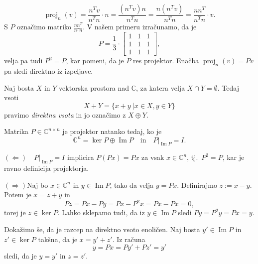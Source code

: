 \documentclass[mat1]{fmfdelo}
\newcommand{\C}{\mathbb C}
\DeclareMathOperator{\Ima}{Im}
\begin{document}
\begin{zgled}
\begin{equation*}
        \operatorname{proj}_{n}(v) = \frac{n^T  v}{n^T n}\cdot n = \frac{\left(n^T  v\right)n}{n^T n} = \frac{n\left(n^T  v\right)}{n^T n} = \frac{n  n^T}{n^T n}\cdot v.
    \end{equation*}
    S $P$ označimo matriko $\frac{n  n^T}{n^T n}$. V našem primeru izračunamo, da je
    \begin{equation*}
        P = \frac{1}{3}\cdot
        \begin{bmatrix}
            1 & 1 & 1 \\
            1 & 1 & 1 \\
            1 & 1 & 1
        \end{bmatrix},
    \end{equation*}
    velja pa tudi $P^2 = P$, kar pomeni, da je $P$ res projektor. Enačba $\operatorname{proj}_n (v) = P v$ pa sledi direktno iz izpeljave.
\end{zgled}
\begin{definicija}
    Naj bosta $X$ in $Y$ vektorska prostora nad $\C$, za katera velja $X \cap Y = \emptyset$. Tedaj vsoti
    \begin{equation*}
        X + Y = \{x+y \ | x\in X, y\in Y\}
    \end{equation*}
    pravimo \emph{direktna vsota} in jo označimo z $X \oplus Y$.
\end{definicija}
\begin{trditev}
    Matrika $P \in \C^{n \times n}$ je projektor natanko tedaj, ko je
    \begin{equation*}
        \C^n = \ker P \oplus \Ima P\quad  \text{in}\quad P|_{\Ima P} = I.
    \end{equation*}
\end{trditev}
\begin{dokaz}
    $(\Leftarrow)$$\quad P|_{\Ima P} = I$ implicira $P\left(P x\right) = P x$ za vsak $x \in \C^n$, tj.\ $P^2 = P$, kar je ravno definicija projektorja.

    $(\Rightarrow)$Naj bo $x \in \C^n$ in $y \in \Ima P$, tako da velja $y = P x$. Definirajmo $z := x-y$. Potem je $x = z + y$ in
    \begin{equation*}
        P z = P x - P y = P x - P^2 x = P x - P x = 0,
    \end{equation*}
    torej je $z \in \ker P$. Lahko sklepamo tudi, da iz $y \in \Ima P$ sledi $P y = P^2 y = P x = y$.

    Dokažimo še, da je razcep na direktno vsoto enoličen. Naj bosta $y' \in \Ima P$ in $z' \in \ker P$ takšna, da je $x = y' + z'$. Iz računa
    \begin{equation*}
        y = P x = P y' + P z' = y'
    \end{equation*}
    sledi, da je $y = y'$ in $z = z'$.
\end{dokaz}
\end{document}
